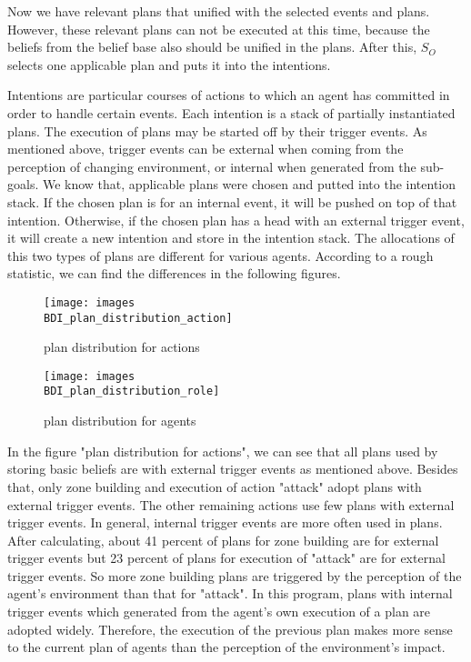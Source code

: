 Now we have relevant plans that unified with the selected events and plans. However, these relevant plans can not be executed at this time, because the beliefs from the belief base also should be unified in the plans. After this, $S_O$ selects one applicable plan and puts it into the intentions. 

Intentions are particular courses of actions to which an agent has committed in order to handle certain events. Each intention is a stack of partially instantiated plans\cite{rafael_Javabased_2007}. The execution of plans may be started off by their trigger events. As mentioned above, trigger events can be external when coming from the perception of changing environment, or internal when generated from the sub-goals. We know that, applicable plans were chosen and putted into the intention stack. If the chosen plan is for an internal event, it will be pushed on top of that intention. Otherwise, if the chosen plan has a head with an external trigger event, it will create a new intention and store in the intention stack. The allocations of this two types of plans are different for various agents. According to a rough statistic, we can find the differences in the following figures.
\begin{figure}
\centering
\begin{minipage}[!htbp]{\linewidth}
\texttt{[image: images\\BDI\_plan\_distribution\_action]}
\caption{plan distribution for actions}
\label{fig:plan_allocation}
\end{minipage}
\end{figure}
\begin{figure}
\centering
\begin{minipage}[!htbp]{\linewidth}
\texttt{[image: images\\BDI\_plan\_distribution\_role]}
\caption{plan distribution for agents}
\label{fig:baselinex}
\end{minipage}
\end{figure}
 
In the figure "plan distribution for actions", we can see that all plans used by storing basic beliefs are with external trigger events as mentioned above. Besides that, only zone building and execution of action "attack" adopt plans with external trigger events. The other remaining actions use few plans with external trigger events. In general, internal trigger events are more often used in plans. After calculating, about 41 percent of plans for zone building are for external trigger events but 23 percent of plans for execution of "attack" are for external trigger events. So more zone building plans are triggered by the perception of the agent’s environment than that for "attack". In this program, plans with internal trigger events which generated from the agent’s own execution of a plan are adopted widely. Therefore, the execution of the previous plan makes more sense to the current plan of agents than the perception of the environment's impact.

